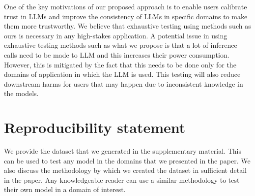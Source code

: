 \documentclass{article} %
\begin{document}
One of the key motivations of our proposed approach is to enable users calibrate trust in LLMs and improve the consistency of LLMs in specific domains to make them more trustworthy. We believe that exhaustive testing using methods such as ours is necessary in any high-stakes application. A potential issue in using exhaustive testing methods such as what we propose is that a lot of inference calls need to be made to LLM and this increases their power consumption. However, this is mitigated by the fact that this needs to be done only for the domains of application in which the LLM is used. This testing will also reduce downstream harms for users that may happen due to inconsistent knowledge in the models.

\section{Reproducibility statement}
\label{sec:reproducibililty_statement}
We provide the dataset that we generated in the supplementary material. This can be used to test any model in the domains that we presented in the paper. We also discuss the methodology by which we created the dataset in sufficient detail in the paper. Any knowledgeable reader can use a similar methodology to test their own model in a domain of interest.
\end{document}
